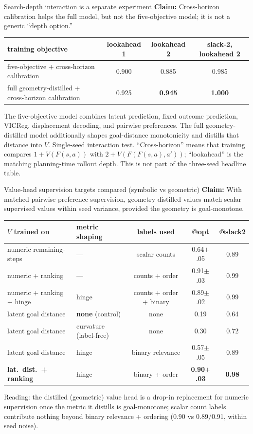 \documentclass[aspectratio=169,10pt]{beamer}
\newcommand{\claim}[1]{\textcolor{cviolet}{\textbf{Claim:} #1}}
\begin{document}
\begin{frame}{Search-depth interaction is a separate experiment}
\claim{Cross-horizon calibration helps the full model, but not the
five-objective model; it is not a generic ``depth option.''}
\centering\small
\begin{tabular}{lccc}
\toprule
training objective & lookahead 1 & lookahead 2 & slack-2, lookahead 2\\
\midrule
five-objective + cross-horizon calibration & 0.900 & 0.885 & 0.985\\
full geometry-distilled + cross-horizon calibration & 0.925 & \textbf{0.945} & \textbf{1.000}\\
\bottomrule
\end{tabular}

\medskip\footnotesize
The five-objective model combines latent prediction, fixed outcome prediction,
VICReg, displacement decoding, and pairwise preferences. The full
geometry-distilled model additionally shapes goal-distance monotonicity and
distills that distance into $V$. Single-seed interaction test.
``Cross-horizon'' means that training compares
$1+V(F(s,a))$ with $2+V(F(F(s,a),a'))$; ``lookahead'' is the matching
planning-time rollout depth. This is not part of the three-seed headline table.
\end{frame}

\begin{frame}{Value-head supervision targets compared (symbolic vs geometric)}
\claim{With matched pairwise preference supervision, geometry-distilled values
match scalar-supervised values within seed variance, provided the geometry is
goal-monotone.}
\centering\small
\begin{tabular}{llccc}
\toprule
$V$ trained on & metric shaping & labels used & @opt & @slack2\\
\midrule
numeric remaining-steps & --- & scalar counts & 0.64$\pm$.05 & 0.89\\
numeric + ranking & --- & counts + order & 0.91$\pm$.03 & 0.99\\
numeric + ranking + hinge & hinge & counts + order + binary & 0.89$\pm$.02 & 0.99\\
\midrule
latent goal distance & \textbf{none} (control) & none & 0.19 & 0.64\\
latent goal distance & curvature (label-free) & none & 0.30 & 0.72\\
latent goal distance & hinge & binary relevance & 0.57$\pm$.05 & 0.89\\
\textbf{lat.\ dist.\ + ranking} & hinge & binary + order & \textbf{0.90$\pm$.03} & \textbf{0.98}\\
\bottomrule
\end{tabular}

\smallskip
Reading: the distilled (geometric) value head is a drop-in replacement for
numeric supervision once the metric it distills is goal-monotone; scalar
count labels contribute nothing beyond binary relevance + ordering
(0.90 vs 0.89/0.91, within seed noise).
\end{frame}
\end{document}
